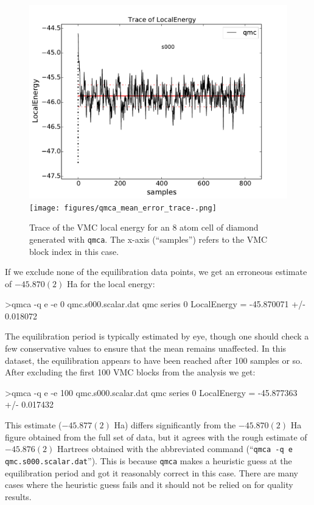 \begin{figure}
\begin{center}
\ifpdf
\includegraphics[trim = 0mm 0mm 0mm 0mm,clip,width=0.75\columnwidth]{figures/qmca_mean_error_trace.pdf}
\else
\texttt{[image: figures/qmca\_mean\_error\_trace-.png]}
\fi
\caption{Trace of the VMC local energy for an 8 atom cell of diamond generated with \texttt{qmca}.  The x-axis (``samples'') refers to the VMC block index in this case.}
\label{fig:qmca_mean_error_trace}
\end{center}
\end{figure}

If we exclude none of the equilibration data points, we get an 
erroneous estimate of $-45.870(2)$ Ha for the local energy:
\begin{shade}
>qmca -q e -e 0 qmc.s000.scalar.dat 
qmc  series 0  LocalEnergy           =  -45.870071 +/- 0.018072
\end{shade}
\noindent
The equilibration period is typically estimated by eye, though one should
check a few conservative values to ensure that the mean remains 
unaffected.  In this dataset, the equilibration appears to have been 
reached after 100 samples or so.  After excluding the first 100 
VMC blocks from the analysis we get:
\begin{shade}
>qmca -q e -e 100 qmc.s000.scalar.dat 
qmc  series 0  LocalEnergy           =  -45.877363 +/- 0.017432
\end{shade}
\noindent
This estimate ($-45.877(2)$ Ha) differs significantly from the 
$-45.870(2)$ Ha figure obtained from the full set of data, but it 
agrees with the rough estimate of $-45.876(2)$ Hartrees obtained 
with the abbreviated command (``\texttt{qmca -q e qmc.s000.scalar.dat}'').
This is because \texttt{qmca} makes a heuristic guess at the 
equilibration period and got it reasonably correct in this case. 
There are many cases where the heuristic guess fails and it should not 
be relied on for quality results.

